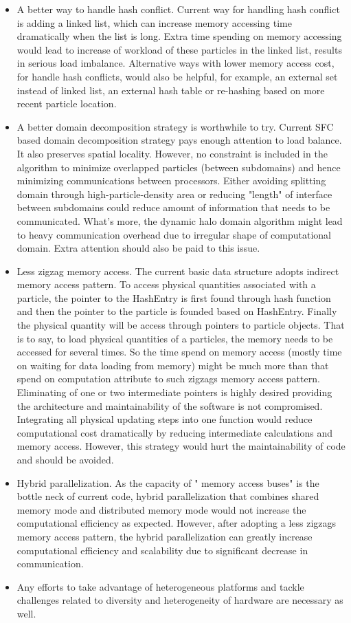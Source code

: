 \begin{itemize}
\item A better way to handle hash conflict. Current way for handling hash conflict is adding a linked list, which can increase memory accessing time dramatically when the list is long. Extra time spending on memory accessing would lead to increase of workload of these particles in the linked list, results in serious load imbalance. Alternative ways with lower memory access cost, for handle hash conflicts, would also be helpful, for example, an external set instead of linked list, an external hash table or re-hashing based on more recent particle location.
\item A better domain decomposition strategy is worthwhile to try. Current SFC based domain decomposition strategy pays enough attention to load balance. It also preserves spatial locality. However, no constraint is included in the algorithm to minimize overlapped particles (between subdomains) and hence minimizing communications between processors. Either avoiding splitting domain through high-particle-density area or reducing "length" of interface between subdomains could reduce amount of information that needs to be communicated. What's more, the dynamic halo domain algorithm might lead to heavy communication overhead due to irregular shape of computational domain. Extra attention should also be paid to this issue.
\item Less zigzag memory access. The current basic data structure adopts indirect memory access pattern. To access physical quantities associated with a particle, the pointer to the HashEntry is first found through hash function and then the pointer to the particle is founded based on HashEntry. Finally the physical quantity will be access through pointers to particle objects. That is to say, to load physical quantities of a particles, the memory needs to be accessed for several times.
So the time spend on memory access (mostly time on waiting for data loading from memory) might be much more than that spend on computation attribute to such zigzags memory access pattern. Eliminating of one or two intermediate pointers is highly desired providing the architecture and maintainability of the software is not compromised. Integrating all physical updating steps into one function would reduce computational cost dramatically by reducing intermediate calculations and memory access. However, this strategy would hurt the maintainability of code and should be avoided.
\item Hybrid parallelization. As the capacity of " memory access buses" is the bottle neck of current code, hybrid parallelization that combines shared memory mode and distributed memory mode would not increase the computational efficiency as expected. However, after adopting a less zigzags memory access pattern, the hybrid parallelization can greatly increase computational efficiency and scalability due to significant decrease in communication.
\item Any efforts to take advantage of heterogeneous platforms and tackle challenges related to diversity and heterogeneity of hardware are necessary as well.
\end{itemize}

